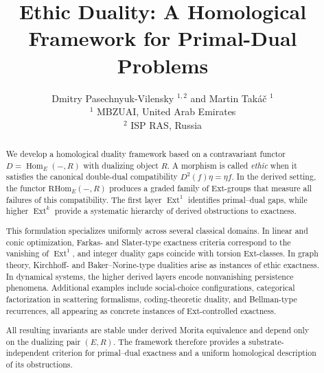 \documentclass[12pt]{article}
\title{Ethic Duality: A Homological Framework for Primal-Dual Problems}
\author{Dmitry Pasechnyuk-Vilensky $^{1, 2}$ and Martin Tak\'a\v{c} $^{1}$\\
$^{1}$ \quad MBZUAI, United Arab Emirates\\
$^{2}$ \quad ISP RAS, Russia}
\newcommand{\Hom}{\operatorname{Hom}}
\newcommand{\Ext}{\operatorname{Ext}}
\theoremstyle{plain}
\theoremstyle{definition}
\theoremstyle{remark}
\numberwithin{equation}{section}
\begin{document}
\maketitle

\begin{abstract}
We develop a homological duality framework based on a contravariant functor
$D=\operatorname{Hom}_E(-,R)$ with dualizing object $R$. A morphism is called
\emph{ethic} when it satisfies the canonical double-dual compatibility
$D^2(f)\eta=\eta f$. In the derived setting, the functor
$\mathrm{RHom}_E(-,R)$ produces a graded family of Ext-groups that measure all
failures of this compatibility. The first layer $\operatorname{Ext}^1$ identifies
primal--dual gaps, while higher $\operatorname{Ext}^k$ provide a systematic
hierarchy of derived obstructions to exactness.

This formulation specializes uniformly across several classical domains.  
In linear and conic optimization, Farkas- and Slater-type exactness criteria
correspond to the vanishing of $\operatorname{Ext}^1$, and integer duality gaps
coincide with torsion Ext-classes.  
In graph theory, Kirchhoff- and Baker--Norine-type dualities arise as instances of
ethic exactness. In dynamical systems, the higher derived layers encode
nonvanishing persistence phenomena. Additional examples include social-choice
configurations, categorical factorization in scattering formalisms, coding-theoretic
duality, and Bellman-type recurrences, all appearing as concrete instances of
Ext-controlled exactness.

All resulting invariants are stable under derived Morita equivalence and depend
only on the dualizing pair $(E,R)$. The framework therefore provides a
substrate-independent criterion for primal--dual exactness and a uniform
homological description of its obstructions.
\end{abstract}


\end{document}
